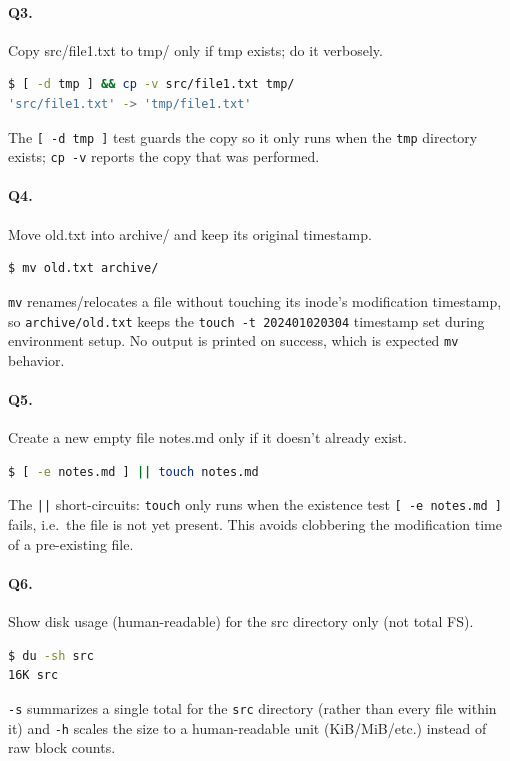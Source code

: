 \paragraph{Q3.} Copy src/file1.txt to tmp/ only if tmp exists; do it verbosely.
\begin{lstlisting}[language=bash,caption={Q3 evidence: \texttt{[ -d tmp ] \&\& cp -v src/file1.txt tmp/}},label={Listing:Q3}]
$ [ -d tmp ] && cp -v src/file1.txt tmp/
'src/file1.txt' -> 'tmp/file1.txt'
\end{lstlisting}
The \texttt{[ -d tmp ]} test guards the copy so it only runs when the \texttt{tmp} directory exists; \texttt{cp -v} reports the copy that was performed.

\paragraph{Q4.} Move old.txt into archive/ and keep its original timestamp.
\begin{lstlisting}[language=bash,caption={Q4 evidence: \texttt{mv old.txt archive/}},label={Listing:Q4}]
$ mv old.txt archive/
\end{lstlisting}
\texttt{mv} renames/relocates a file without touching its inode's modification timestamp, so \texttt{archive/old.txt} keeps the \texttt{touch -t 202401020304} timestamp set during environment setup. No output is printed on success, which is expected \texttt{mv} behavior.

\paragraph{Q5.} Create a new empty file notes.md only if it doesn't already exist.
\begin{lstlisting}[language=bash,caption={Q5 evidence: \texttt{[ -e notes.md ] || touch notes.md}},label={Listing:Q5}]
$ [ -e notes.md ] || touch notes.md
\end{lstlisting}
The \texttt{||} short-circuits: \texttt{touch} only runs when the existence test \texttt{[ -e notes.md ]} fails, i.e.\ the file is not yet present. This avoids clobbering the modification time of a pre-existing file.

\paragraph{Q6.} Show disk usage (human-readable) for the src directory only (not total FS).
\begin{lstlisting}[language=bash,caption={Q6 evidence: \texttt{du -sh src}},label={Listing:Q6}]
$ du -sh src
16K	src
\end{lstlisting}
\texttt{-s} summarizes a single total for the \texttt{src} directory (rather than every file within it) and \texttt{-h} scales the size to a human-readable unit (KiB/MiB/etc.) instead of raw block counts.

